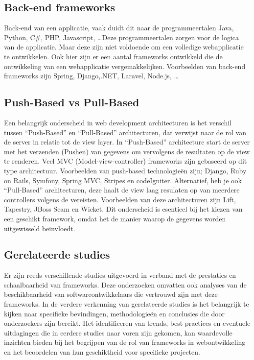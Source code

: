 \documentclass{hogent-article}
\begin{document}
\subsection{Back-end frameworks}%
\label{sub:backend_frameworks}
Back-end van een applicatie, vaak duidt dit naar de programmeertalen Java, Python, C\#, PHP, Javascript, \ldots Deze programmeertalen zorgen voor de logica van de applicatie. Maar deze zijn niet voldoende om een volledige webapplicatie te ontwikkelen. Ook hier zijn er een aantal frameworks ontwikkeld die de ontwikkeling van een webapplicatie vergemakkelijken.
Voorbeelden van back-end frameworks zijn Spring, Django,.NET, Laravel, Node.js, \ldots\textcite{Kaluza2019}

\subsection{Push-Based vs Pull-Based}%
Een belangrijk onderscheid in web development architecturen is het verschil tussen ``Push-Based'' en ``Pull-Based'' architecturen, dat verwijst naar de rol van de server in relatie tot de view layer.\textcite{Lomas2022}
\bigskip
In ``Push-Based'' architecture start de server met het verzenden (Pushen) van gegevens om vervolgens de resultaten op de view te renderen. Veel MVC (Model-view-controller) frameworks zijn gebaseerd op dit type architectuur. Voorbeelden van push-based technologieën zijn; Django, Ruby on Rails, Symfony, Spring MVC, Stripes en codeIgniter.
\bigskip
Alternatief, heb je ook ``Pull-Based'' architecturen, deze haalt de view laag resulaten op van meerdere controllers volgens de vereisten. Voorbeelden van deze architecturen zijn Lift, Tapestry, JBoss Seam en Wicket.
\bigskip
Dit onderscheid is esentieel bij het kiezen van een geschikt framework, omdat het de manier waarop de gegevens worden uitgewisseld beïnvloedt.
\subsection{Ge\-rel\-at\-eerde studies}%
\label{sub:Gerelateerde_studies}
Er zijn reeds verschillende studies uitgevoerd in verband met de prestaties en schaalbaarheid van frameworks. Deze onderzoeken omvatten ook analyses van de beschikbaarheid van soft\-ware\-ont\-wik\-kel\-aars die vertrouwd zijn met deze frameworks.
\bigskip
In de verdere verkenning van ge\-rel\-a\-teer\-de studies is het belangrijk te kijken naar specifieke bevindingen, methodologieën en conclusies die door onderzoekers zijn bereikt. Het identificeren van trends, best practices en e\-ven\-tu\-ele uitdagingen die in eerdere studies naar voren zijn gekomen, kan waardevolle inzichten bieden bij het begrijpen van de rol van frameworks in webontwikkeling en het beoordelen van hun geschiktheid voor specifieke projecten.
\pagebreak
\end{document}
